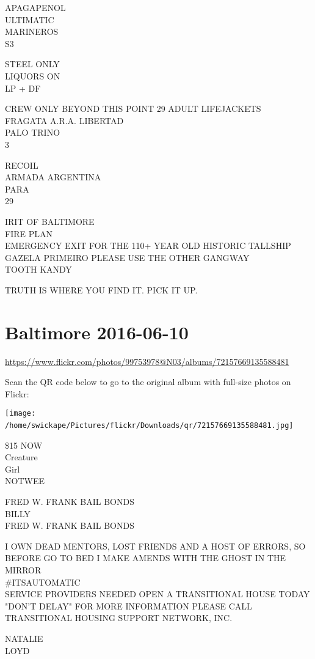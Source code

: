\documentclass[10pt,letterpaper]{article}
\begin{document}
APAGAPENOL\\
ULTIMATIC\\
MARINEROS\\
S3

STEEL ONLY\\
LIQUORS ON\\
LP + DF

CREW ONLY BEYOND THIS POINT 29 ADULT LIFEJACKETS\\
FRAGATA A.R.A. LIBERTAD\\
PALO TRINO\\
3

RECOIL\\
ARMADA ARGENTINA\\
PARA\\
29

IRIT OF BALTIMORE\\
FIRE PLAN\\
EMERGENCY EXIT FOR THE 110+ YEAR OLD HISTORIC TALLSHIP GAZELA PRIMEIRO PLEASE USE THE OTHER GANGWAY\\
TOOTH KANDY

TRUTH IS WHERE YOU FIND IT.  PICK IT UP.
\

\section*{Baltimore 2016-06-10}

\url{https://www.flickr.com/photos/99753978@N03/albums/72157669135588481}

Scan the QR code below to go to the original album with full-size photos on Flickr:

\texttt{[image: /home/swickape/Pictures/flickr/Downloads/qr/72157669135588481.jpg]}
\

\$15 NOW\\
Creature\\
Girl\\
NOTWEE

FRED W. FRANK BAIL BONDS\\
BILLY\\
FRED W. FRANK BAIL BONDS

I OWN DEAD MENTORS, LOST FRIENDS AND A HOST OF ERRORS, SO BEFORE GO TO BED I MAKE AMENDS WITH THE GHOST IN THE MIRROR\\
\#ITSAUTOMATIC\\
SERVICE PROVIDERS NEEDED OPEN A TRANSITIONAL HOUSE TODAY "DON'T DELAY" FOR MORE INFORMATION PLEASE CALL TRANSITIONAL HOUSING SUPPORT NETWORK, INC.

NATALIE\\
LOYD
\end{document}
